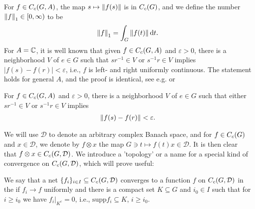For $f \in C_c(G,A)$, the map $s \mapsto \left\lVert f(s) \right\rVert$ is in $C_c(G)$, and we define the number $\left\lVert f \right\rVert_1 \in [0,\infty)$ to be
\begin{align*}
\left\lVert f \right\rVert_1 = \int_G \left\lVert f(t) \right\rVert \mathrm{d} t.
\end{align*}
For $A= \mathbb{C}$, it is well known that given $f \in C_c(G,A)$ and $\varepsilon > 0$, there is a neighborhood $V$ of $e \in G$ such that $sr^{-1} \in V$ or $s^{-1}r \in V$ implies $| f(s) - f(r)| < \varepsilon$, i.e., $f$ is left- and right uniformly continuous. The statement holds for general $A$, and the proof is identical, see e.g. \cite[Proposition 2.6]{folland2016fourier} or \cite[Lemma 1.88]{williamscrossed}
\begin{lemma}
For $f \in C_c(G,A)$ and $\varepsilon>0$, there is a neighborhood $V$ of $e \in G$ such that either $sr^{-1} \in V$ or $s^{-1}r \in V$ implies
\begin{align*}
	\left\lVert f(s)  - f(r) \right\rVert < \varepsilon.
\end{align*}
\label{int:lrunicont}
\end{lemma}

We will use $\mathcal{D}$ to denote an arbitrary complex Banach space, and for $f \in C_c(G)$ and $x \in \mathcal{D}$, we denote by $f \otimes x$ the map $G \ni t \mapsto f(t)x \in \mathcal{D}$. It is then clear that $f \otimes x \in C_c(G,\mathcal{D})$. We introduce a 'topology' or a name for a special kind of convergence on $C_c(G,\mathcal{D})$, which will prove useful:
\begin{definition}
We say that a net $\{f_i\}_{i \in I} \subseteq C_c(G,\mathcal{D})$ converges to a function $f$ on $C_c(G,\mathcal{D})$ in the  if $f_i \to f$ uniformly and there is a compact set $K \subseteq G$ and $i_0 \in I$ such that for $i \geq i_0$ we have $f_i \big|_{K^c} = 0$, i.e., $\mathrm{supp} f_i \subseteq K$, $i \geq i_0$.
\end{definition}


